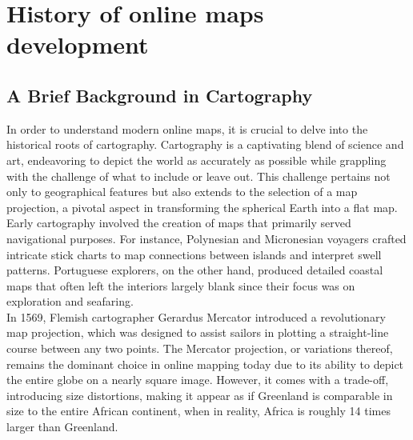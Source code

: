 \documentclass[10pt,oneside,english,a4paper]{article}
\begin{document}
\section{History of online maps development} \label{history}

\subsection{A Brief Background in Cartography} \label{history:brief}
In order to understand modern online maps, it is crucial to delve into the historical roots of cartography. Cartography is a captivating blend of science and art, endeavoring to depict the world as accurately as possible while grappling with the challenge of what to include or leave out. This challenge pertains not only to geographical features but also extends to the selection of a map projection, a pivotal aspect in transforming the spherical Earth into a flat map.
\\Early cartography involved the creation of maps that primarily served navigational purposes. For instance, Polynesian and Micronesian voyagers crafted intricate stick charts to map connections between islands and interpret swell patterns. Portuguese explorers, on the other hand, produced detailed coastal maps that often left the interiors largely blank since their focus was on exploration and seafaring.
\\In 1569, Flemish cartographer Gerardus Mercator introduced a revolutionary map projection\cite{Forrest2021}, which was designed to assist sailors in plotting a straight-line course between any two points. The Mercator projection, or variations thereof, remains the dominant choice in online mapping today due to its ability to depict the entire globe on a nearly square image. However, it comes with a trade-off, introducing size distortions, making it appear as if Greenland is comparable in size to the entire African continent, when in reality, Africa is roughly 14 times larger than Greenland.
\end{document}
